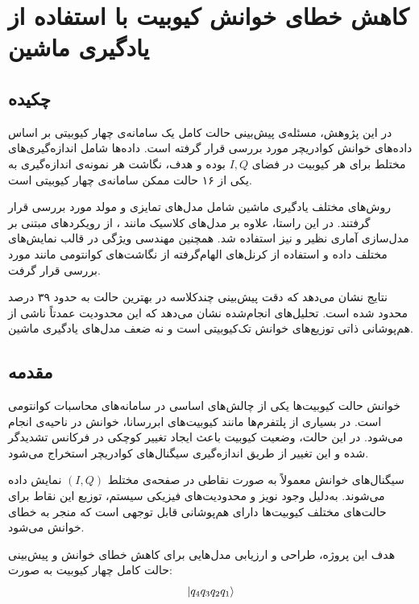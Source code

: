 
\chapter{کاهش خطای خوانش کیوبیت با استفاده از یادگیری ماشین}

\section*{چکیده}

در این پژوهش، مسئله‌ی پیش‌بینی حالت کامل یک سامانه‌ی چهار کیوبیتی بر اساس داده‌های خوانش کوادریچر مورد بررسی قرار گرفته است. داده‌ها شامل اندازه‌گیری‌های مختلط برای هر کیوبیت در فضای \(I,Q\) بوده و هدف، نگاشت هر نمونه‌ی اندازه‌گیری به یکی از ۱۶ حالت ممکن سامانه‌ی چهار کیوبیتی است. 

روش‌های مختلف یادگیری ماشین شامل مدل‌های تمایزی و مولد مورد بررسی قرار گرفتند. در این راستا، علاوه بر مدل‌های کلاسیک مانند ، از رویکردهای مبتنی بر مدل‌سازی آماری نظیر  و  نیز استفاده شد. همچنین مهندسی ویژگی در قالب نمایش‌های مختلف داده و استفاده از کرنل‌های الهام‌گرفته از نگاشت‌های کوانتومی مانند  مورد بررسی قرار گرفت.

نتایج نشان می‌دهد که دقت پیش‌بینی چندکلاسه در بهترین حالت به حدود ۳۹ درصد محدود شده است. تحلیل‌های انجام‌شده نشان می‌دهد که این محدودیت عمدتاً ناشی از هم‌پوشانی ذاتی توزیع‌های خوانش تک‌کیوبیتی است و نه ضعف مدل‌های یادگیری ماشین.

\section{مقدمه}

خوانش حالت کیوبیت‌ها یکی از چالش‌های اساسی در سامانه‌های محاسبات کوانتومی است. در بسیاری از پلتفرم‌ها مانند کیوبیت‌های ابررسانا، خوانش در ناحیه‌ی  انجام می‌شود. در این حالت، وضعیت کیوبیت باعث ایجاد تغییر کوچکی در فرکانس تشدیدگر شده و این تغییر از طریق اندازه‌گیری سیگنال‌های کوادریچر استخراج می‌شود.

سیگنال‌های خوانش معمولاً به صورت نقاطی در صفحه‌ی مختلط \((I,Q)\) نمایش داده می‌شوند. به‌دلیل وجود نویز و محدودیت‌های فیزیکی سیستم، توزیع این نقاط برای حالت‌های مختلف کیوبیت‌ها دارای هم‌پوشانی قابل توجهی است که منجر به خطای خوانش می‌شود.

هدف این پروژه، طراحی و ارزیابی مدل‌هایی برای کاهش خطای خوانش و پیش‌بینی حالت کامل چهار کیوبیت به صورت:
\[
\ket{q_4 q_3 q_2 q_1}
\]

